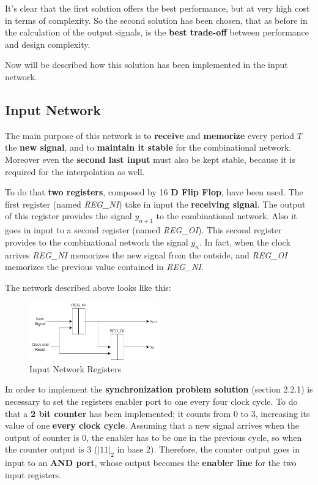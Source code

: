 It's clear that the first solution offers the best performance, but at very high cost in terms of complexity. So the second solution has been chosen, that as before in the calculation of the output signals, is the \textbf{best trade-off} between performance and design complexity.

Now will be described how this solution has been implemented in the input network.

\subsection{Input Network}

The main purpose of this network is to \textbf{receive} and \textbf{memorize} every period $T$ the \textbf{new signal}, and to \textbf{maintain it stable} for the combinational network. Moreover even the \textbf{second last input} must also be kept stable, because it is required for the interpolation as well.

To do that \textbf{two registers}, composed by 16 \textbf{D Flip Flop}, have been used. The first register (named \textit{REG\_NI}) take in input the \textbf{receiving signal}. The output of this register provides the signal $y_{n+1}$ to the combinational network. Also it goes in input to a second register (named \textit{REG\_OI}). This second register provides to the combinational network the signal $y_n$. In fact, when the clock arrives \textit{REG\_NI} memorizes the new signal from the outside, and \textit{REG\_OI} memorizes the previous value contained in \textit{REG\_NI}.

The network described above looks like this:

\begin{figure}[H]
    \centering
    \includegraphics[width=0.5\textwidth]{img/Chapter2/InputNetwork1.png}
    \caption{Input Network Registers}
    \label{fig:InputNetwork1}
\end{figure}

In order to implement the \textbf{synchronization problem solution} (section 2.2.1) is necessary to set the registers enabler port to one every four clock cycle. To do that a \textbf{2 bit counter} has been implemented; it counts from 0 to 3, increasing its value of one \textbf{every clock cycle}. Assuming that a new signal arrives when the output of counter is 0, the enabler has to be one in the previous cycle, so when the counter output is 3 ($|11|_2$ in base 2). Therefore, the counter output goes in input to an \textbf{AND port}, whose output becomes the \textbf{enabler line} for the two input registers.

